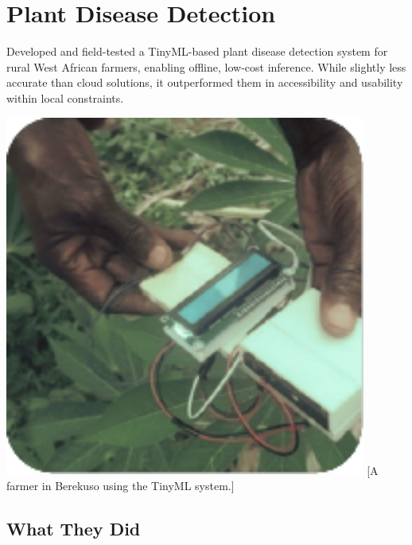\documentclass[../../main]{subfiles}
\begin{document}
\section{Plant Disease Detection} \label{sec:}

\begin{minipage} {0.62\textwidth}
    \vspace{-0.8cm}

    Developed and field-tested a TinyML-based plant disease detection system for
    rural West African farmers, enabling offline, low-cost inference. While
    slightly less accurate than cloud solutions, it outperformed them in
    accessibility and usability within local constraints.

\end{minipage}
\hfill
\begin{minipage} {0.35\textwidth}
    \begin{center}
        \vspace{-1.2cm}
        \includegraphics[width = 0.89\textwidth] {pics/disease_detection.pdf}
        [A farmer in Berekuso using the TinyML system.]{}
        \label{fig:case1Pic}
    \end{center}
\end{minipage}

\subsection{What They Did}
\end{document}
